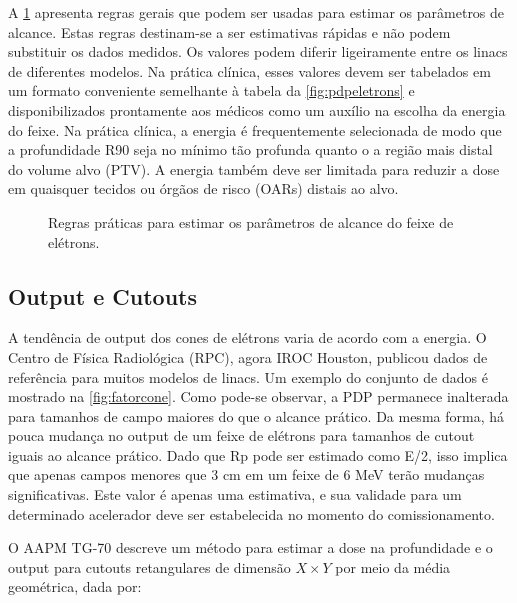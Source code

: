 \documentclass[11pt,a4paper]{article}
\newcounter{exemplo}
\begin{document}
	A \ref{fig:estimarOsRs} apresenta regras gerais que podem ser usadas para estimar os parâmetros de alcance. Estas regras destinam-se a ser estimativas rápidas e não podem substituir os dados medidos. Os valores podem diferir ligeiramente entre os linacs de diferentes modelos. Na prática clínica, esses valores devem ser tabelados em um formato conveniente semelhante à tabela da \ref{fig:pdpeletrons} e disponibilizados prontamente aos médicos como um auxílio na escolha da energia do feixe. Na prática clínica, a energia é frequentemente selecionada de modo que a profundidade R90 seja no mínimo tão profunda quanto o a região mais distal do volume alvo (PTV). A energia também deve ser limitada para reduzir a dose em quaisquer tecidos ou órgãos de risco (OARs) distais ao alvo.

	\begin{figure}[h]
		\centering
		\caption{Regras práticas para estimar os parâmetros de alcance do feixe de elétrons.}
		\label{fig:estimarOsRs}
	\end{figure}

\subsection*{Output e Cutouts}

	A tendência de output dos cones de elétrons varia de acordo com a energia. O Centro de Física Radiológica (RPC), agora IROC Houston, publicou dados de referência para muitos modelos de linacs. Um exemplo do conjunto de dados é mostrado na \ref{fig:fatorcone}. Como pode-se observar, a PDP permanece inalterada para tamanhos de campo maiores do que o alcance prático. Da mesma forma, há pouca mudança no output de um feixe de elétrons para tamanhos de cutout iguais ao alcance prático. Dado que Rp pode ser estimado como E/2, isso implica que apenas campos menores que 3 cm em um feixe de 6 MeV terão mudanças significativas. Este valor é apenas uma estimativa, e sua validade para um determinado acelerador deve ser estabelecida no momento do comissionamento.

	O AAPM TG-70 descreve um método para estimar a dose na profundidade e o output para cutouts retangulares de dimensão $X \times Y$ por meio da média geométrica, dada por:
\end{document}
